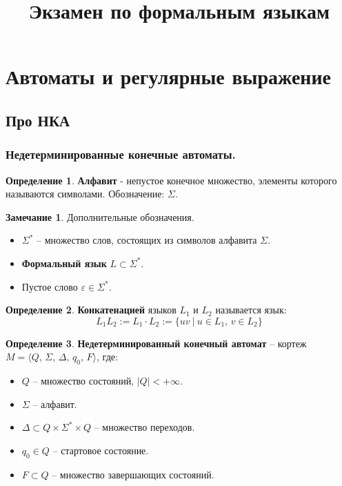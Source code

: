 \documentclass[a4paper,12pt]{article}
\title{Экзамен по формальным языкам}
\theoremstyle{plain}
\theoremstyle{definition}
\newtheorem{definition}{Определение}[subsection]
\newtheorem*{note}{Замечание}
\theoremstyle{remark}
\begin{document}
\tableofcontents
\newpage

\section{Автоматы и регулярные выражение}
\subsection{Про НКА}
\subsubsection*{Недетерминированные конечные автоматы.}
\begin{definition}
	\textbf{Алфавит} - непустое конечное множество, элементы которого называются символами. Обозначение: $\Sigma$.
\end{definition}

\begin{note} Дополнительные обозначения.

	\begin{itemize}
		\item $\Sigma^*$ -- множество слов, состоящих из символов алфавита $\Sigma$.
		\item \textbf{Формальный язык} $L \subset \Sigma^*$.
		\item Пустое слово $\varepsilon \in \Sigma^*$.
	\end{itemize}
\end{note}

\begin{definition}
	\textbf{Конкатенацией} языков $L_1$ и $L_2$ называется язык:
	\[
		L_1L_2 := L_1\cdot L_2 := \{uv \:|\: u \in L_1,\, v \in L_2\}
	\]
\end{definition}

\begin{definition}
	\textbf{Недетерминированный конечный автомат} -- кортеж $M = \langle Q,\,\Sigma,\, \Delta,\, q_0,\, F \rangle$, где:
	\begin{itemize}
		\item $Q$ -- множество состояний, $|Q| < +\infty$.
		\item $\Sigma$ -- алфавит.
		\item $\Delta \subset Q \times \Sigma^* \times Q$ -- множество переходов.
		\item $q_0 \in Q$ -- стартовое состояние.
		\item $F \subset Q$ -- множество завершающих состояний.
	\end{itemize}
\end{definition}
\end{document}

